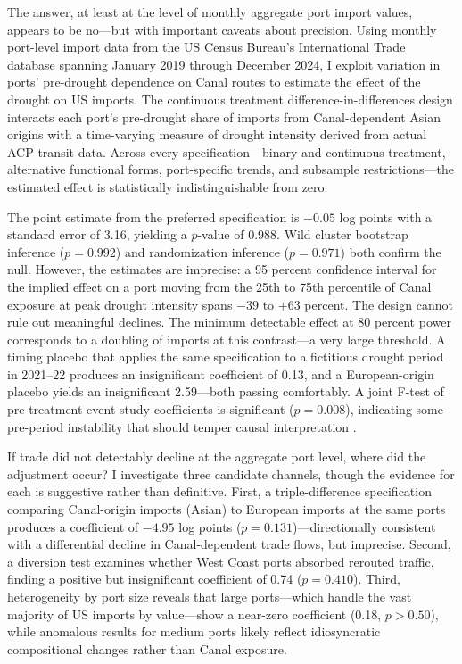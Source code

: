 \documentclass[12pt]{article}
\begin{document}
The answer, at least at the level of monthly aggregate port import values, appears to be no---but with important caveats about precision. Using monthly port-level import data from the US Census Bureau's International Trade database spanning January 2019 through December 2024, I exploit variation in ports' pre-drought dependence on Canal routes to estimate the effect of the drought on US imports. The continuous treatment difference-in-differences design interacts each port's pre-drought share of imports from Canal-dependent Asian origins with a time-varying measure of drought intensity derived from actual ACP transit data. Across every specification---binary and continuous treatment, alternative functional forms, port-specific trends, and subsample restrictions---the estimated effect is statistically indistinguishable from zero.

The point estimate from the preferred specification is $-0.05$ log points with a standard error of 3.16, yielding a $p$-value of 0.988. Wild cluster bootstrap inference ($p = 0.992$) and randomization inference ($p = 0.971$) both confirm the null. However, the estimates are imprecise: a 95 percent confidence interval for the implied effect on a port moving from the 25th to 75th percentile of Canal exposure at peak drought intensity spans $-39$ to $+63$ percent. The design cannot rule out meaningful declines. The minimum detectable effect at 80 percent power corresponds to a doubling of imports at this contrast---a very large threshold. A timing placebo that applies the same specification to a fictitious drought period in 2021--22 produces an insignificant coefficient of 0.13, and a European-origin placebo yields an insignificant 2.59---both passing comfortably. A joint F-test of pre-treatment event-study coefficients is significant ($p = 0.008$), indicating some pre-period instability that should temper causal interpretation \citep{roth2022pretest}.

If trade did not detectably decline at the aggregate port level, where did the adjustment occur? I investigate three candidate channels, though the evidence for each is suggestive rather than definitive. First, a triple-difference specification comparing Canal-origin imports (Asian) to European imports at the same ports produces a coefficient of $-4.95$ log points ($p = 0.131$)---directionally consistent with a differential decline in Canal-dependent trade flows, but imprecise. Second, a diversion test examines whether West Coast ports absorbed rerouted traffic, finding a positive but insignificant coefficient of 0.74 ($p = 0.410$). Third, heterogeneity by port size reveals that large ports---which handle the vast majority of US imports by value---show a near-zero coefficient (0.18, $p > 0.50$), while anomalous results for medium ports likely reflect idiosyncratic compositional changes rather than Canal exposure.
\end{document}
